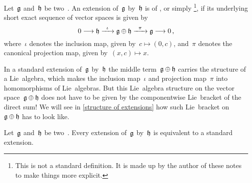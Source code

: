 \begin{definition}
	Let~$\mathfrak{g}$ and~$\mathfrak{h}$ be two~\liealgebras{$\kf$}.
	An extension of~$\mathfrak{g}$ by~$\mathfrak{h}$ is of , or simply %
	\footnote{
		This is not a standard definition.
		It is made up by the author of these notes to make things more explicit.
	}, if its underlying short exact sequence of vector spaces is given by
	\[
		0
		\to
		\hlie
		\xto{\iota}
		\glie \oplus \hlie
		\xto{\pi}
		\glie
		\to
		0 \,,
	\]
	where~$\iota$ denotes the inclusion map, given by~$c \mapsto (0,c)$, and~$\pi$ denotes the canonical projection map, given by~$(x,c) \mapsto x$.
\end{definition}


\begin{warning}
	In a standard extension of~$\mathfrak{g}$ by~$\mathfrak{h}$ the middle term~$\mathfrak{g} \oplus \mathfrak{h}$ carries the structure of a Lie~algebra, which makes the inclusion map~$\iota$ and projection map~$\pi$ into homomorphisms of Lie~algebras.
	But this Lie~algebra structure on the vector space~$\mathfrak{g} \oplus \mathfrak{h}$ does not have to be given by the componentwise Lie~bracket of the direct sum!
	We will see in \cref{structure of extensions} how such Lie~bracket on~$\mathfrak{g} \oplus \mathfrak{h}$ has to look like.
\end{warning}


\begin{proposition}
	\label{every extension is equivalent to a standard one}
	Let~$\mathfrak{g}$ and~$\mathfrak{h}$ be two~\liealgebras{$\kf$}.
	Every extension of~$\mathfrak{g}$ by~$\mathfrak{h}$ is equivalent to a standard extension.
\end{proposition}



